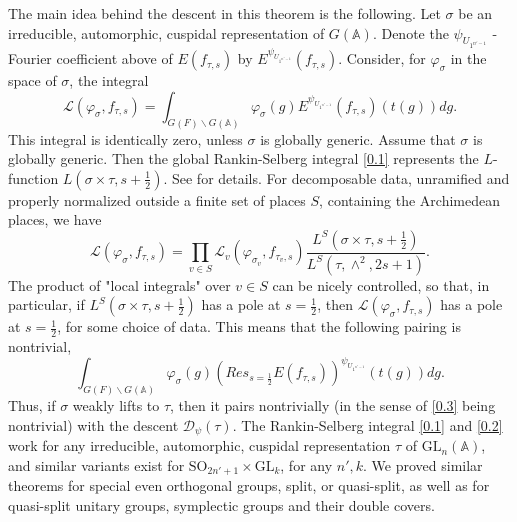 \documentclass[12pts]{amsart}
\newcommand{\BA}{{\mathbb {A}}}
\newcommand{\GL}{{\mathrm{GL}}}
\newcommand{\SO}{{\mathrm{SO}}}
\begin{document}
The main idea behind the descent in this theorem is the following. Let $\sigma$ be an irreducible, automorphic, cuspidal representation of $G(\BA)$. Denote the $\psi_{U_{1^{n'-1}}}$ - Fourier coefficient above of $E(f_{\tau,s})$ by $E^{\psi_{U_{1^{n'-1}}}}(f_{\tau,s})$. Consider, for $\varphi_\sigma$ in the space of $\sigma$, the integral
\begin{equation}\label{0.1}
\mathcal{L}(\varphi_\sigma, f_{\tau,s})=\int_{G(F)\backslash G(\BA)}\varphi_\sigma(g)E^{\psi_{U_{1^{n'-1}}}}(f_{\tau,s})(t(g))dg.
\end{equation}
This integral is identically zero, unless $\sigma$ is globally generic. Assume that $\sigma$ is globally generic. Then the global Rankin-Selberg integral \eqref{0.1} represents the $L$-function $L(\sigma\times \tau,s+\frac{1}{2})$. See \cite{S93} for details. For decomposable data, unramified and properly normalized outside a finite set of places $S$, containing the Archimedean places, we have
\begin{equation}\label{0.2}
\mathcal{L}(\varphi_\sigma, f_{\tau,s})=\prod_{v\in S}
\mathcal{L}_v(\varphi_{\sigma_v}, f_{\tau_v,s})\frac{L^S(\sigma\times \tau,s+\frac{1}{2})}{L^S(\tau,\wedge^2,2s+1)}.
\end{equation}
The product of "local integrals" over $v\in S$ can be nicely controlled, so that, in particular, if $L^S(\sigma\times \tau,s+\frac{1}{2})$ has a pole at $s=\frac{1}{2}$, then $\mathcal{L}(\varphi_\sigma, f_{\tau,s})$ has a pole at $s=\frac{1}{2}$, for some choice of data. This means that the following pairing is nontrivial,
\begin{equation}\label{0.3}
\int_{G(F)\backslash G(\BA)}\varphi_\sigma(g)(Res_{s=\frac{1}{2}}E(f_{\tau,s}))^{\psi_{U_{1^{n'-1}}}}(t(g))dg.
\end{equation}
Thus, if $\sigma$ weakly lifts to $\tau$, then it pairs nontrivially (in the sense of \eqref{0.3} being nontrivial) with the descent $\mathcal{D}_\psi(\tau)$.
The Rankin-Selberg integral \eqref{0.1} and \eqref{0.2} work for any irreducible, automorphic, cuspidal representation $\tau$ of $\GL_n(\BA)$, and similar variants exist for $\SO_{2n'+1}\times \GL_k$, for any $n', k$.   
We proved similar theorems for special even orthogonal groups, split, or quasi-split, as well as for quasi-split unitary groups, symplectic groups and their double covers.
\end{document}
